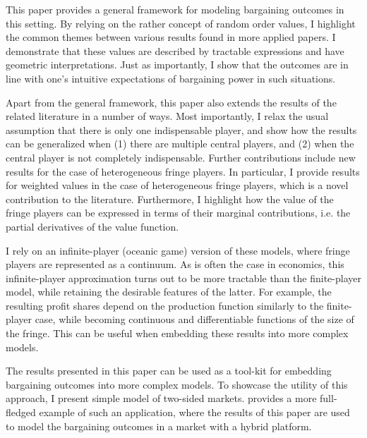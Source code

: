 \documentclass[a4paper]{article}
\begin{document}
This paper provides a general framework for modeling bargaining outcomes in this setting.
By relying on the rather concept of random order values, I highlight the common themes between various results found in more applied papers.
I demonstrate that these values are described by tractable expressions and have geometric interpretations.
Just as importantly, I show that the outcomes are in line with one's intuitive expectations of bargaining power in such situations.

Apart from the general framework, this paper also extends the results of the related literature in a number of ways.
Most importantly, I relax the usual assumption that there is only one indispensable player, and show how the results can be generalized when (1) there are multiple central players, and (2) when the central player is not completely indispensable.
Further contributions include new results for the case of heterogeneous fringe players.
In particular, I provide results for weighted values in the case of heterogeneous fringe players, which is a novel contribution to the literature.
Furthermore, I highlight how the value of the fringe players can be expressed in terms of their marginal contributions, i.e. the partial derivatives of the value function.

I rely on an infinite-player (oceanic game) version of these models, where fringe players are represented as a continuum.
As is often the case in economics, this infinite-player approximation turns out to be more tractable than the  finite-player model, while retaining the desirable features of the latter.
For example, the resulting profit shares depend on the production function similarly to the finite-player case, while becoming continuous and differentiable functions of the size of the fringe.
This can be useful when embedding these results into more complex models.

The results presented in this paper can be used as a tool-kit for embedding bargaining outcomes into more complex models.
To showcase the utility of this approach, I present simple model of two-sided markets.
\textcite{stancsics2023hybrid} provides a more full-fledged example of such an application, where the results of this paper are used to model the bargaining outcomes in a market with a hybrid platform.
\end{document}
